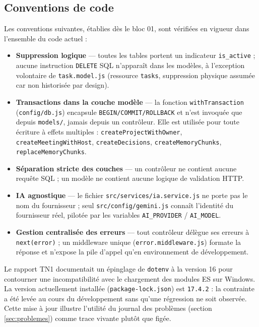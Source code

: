 \documentclass[12pt, a4paper]{article}
\begin{document}
\subsection{Conventions de code}

Les conventions suivantes, établies dès le bloc 01, sont vérifiées en vigueur dans l'ensemble du code actuel :

\begin{itemize}
  \item \textbf{Suppression logique} — toutes les tables portent un indicateur \texttt{is\_active} ; aucune instruction \texttt{DELETE} SQL n'apparaît dans les modèles, à l'exception volontaire de \texttt{task.model.js} (ressource \texttt{tasks}, suppression physique assumée car non historisée par design).
  \item \textbf{Transactions dans la couche modèle} — la fonction \texttt{withTransaction} (\texttt{config/db.js}) encapsule \texttt{BEGIN/COMMIT/ROLLBACK} et n'est invoquée que depuis \texttt{models/}, jamais depuis un contrôleur. Elle est utilisée pour toute écriture à effets multiples : \texttt{createProjectWithOwner}, \texttt{createMeetingWithHost}, \texttt{createDecisions}, \texttt{createMemoryChunks}, \texttt{replaceMemoryChunks}.
  \item \textbf{Séparation stricte des couches} — un contrôleur ne contient aucune requête SQL ; un modèle ne contient aucune logique de validation HTTP.
  \item \textbf{IA agnostique} — le fichier \texttt{src/services/ia.service.js} ne porte pas le nom du fournisseur ; seul \texttt{src/config/gemini.js} connaît l'identité du fournisseur réel, pilotée par les variables \texttt{AI\_PROVIDER} / \texttt{AI\_MODEL}.
  \item \textbf{Gestion centralisée des erreurs} — tout contrôleur délègue ses erreurs à \texttt{next(error)} ; un middleware unique (\texttt{error.middleware.js}) formate la réponse et n'expose la pile d'appel qu'en environnement de développement.
\end{itemize}

\begin{infobox}
  Le rapport TN1 documentait un épinglage de \texttt{dotenv} à la version 16 pour contourner une incompatibilité avec le chargement des modules ES sur Windows. La version actuellement installée (\texttt{package-lock.json}) est \texttt{17.4.2} : la contrainte a été levée au cours du développement sans qu'une régression ne soit observée. Cette mise à jour illustre l'utilité du journal des problèmes (section \ref{sec:problemes}) comme trace vivante plutôt que figée.
\end{infobox}
\end{document}
